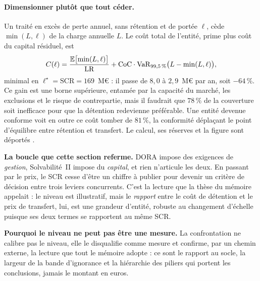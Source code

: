 \paragraph{Dimensionner plutôt que tout céder.} Un traité en excès de perte annuel, sans
rétention et de portée $\ell$, cède $\min(L,\ell)$ de la charge annuelle $L$. Le coût total de
l'entité, prime plus coût du capital résiduel, est
\begin{equation}\label{eq:cout-transfert}
C(\ell)=\frac{\mathbb{E}\bigl[\min(L,\ell)\bigr]}{\mathrm{LR}}
+\mathrm{CoC}\cdot\mathrm{VaR}_{99{,}5\,\%}\bigl(L-\min(L,\ell)\bigr),
\end{equation}
minimal en $\ell^\star=\mathrm{SCR}=169$~M\euro{} : il passe de $8{,}0$ à $2{,}9$~M\euro{} par
an, soit $-64\,\%$. Ce gain est une borne
supérieure, entamée par la capacité du marché, les exclusions et le risque de contrepartie, mais il
faudrait que $78\,\%$ de la couverture soit inefficace pour que la détention redevienne
préférable. Une entité devenue conforme voit en outre ce coût tomber de $81\,\%$, la conformité
déplaçant le point d'équilibre entre rétention et transfert. Le calcul, ses réserves et la figure
sont déportés \matcomp.

\begin{cle}
\textbf{La boucle que cette section referme.} DORA impose des exigences de \emph{gestion},
Solvabilité~II impose du \emph{capital}, et rien n'articule les deux. En passant par le prix,
le SCR cesse d'être un
chiffre à publier pour devenir un critère de décision entre trois leviers concurrents.
C'est la lecture que la thèse du mémoire appelait : le niveau est illustratif, mais le
\emph{rapport} entre le coût de détention et le prix de transfert, lui, est une grandeur
d'entité, robuste au changement d'échelle puisque ses deux termes se rapportent au même SCR.
\end{cle}

\begin{cle}
\textbf{Pourquoi le niveau ne peut pas être une mesure.} La confrontation ne calibre pas le
niveau, elle le
disqualifie comme mesure et confirme, par un chemin externe, la lecture que tout le
mémoire adopte : ce sont le rapport au socle, la largeur de la bande
d'ignorance et la hiérarchie des piliers qui portent les conclusions, jamais le
montant en euros.
\end{cle}

